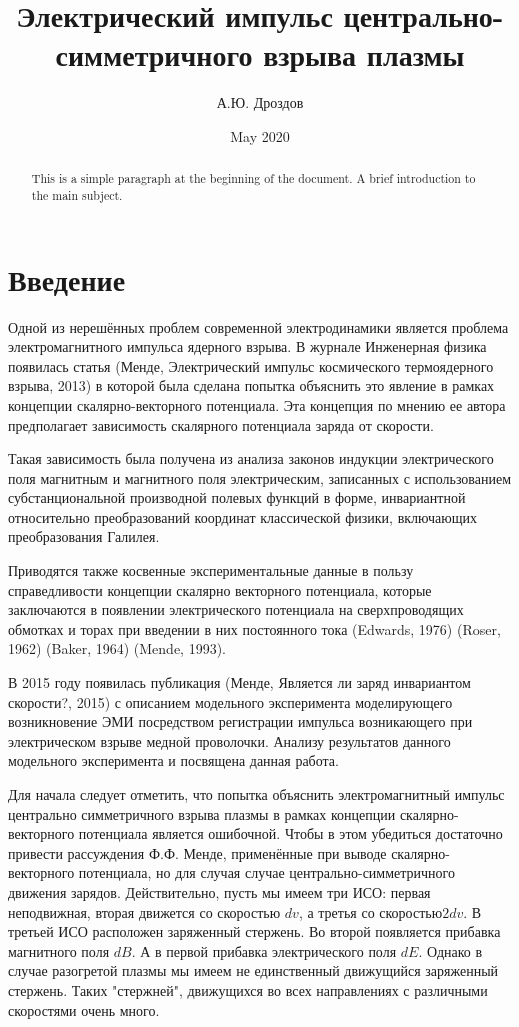 ﻿\documentclass[12pt, letterpaper]{article}
\begin{document}
\title{Электрический импульс центрально-симметричного взрыва плазмы}
\author{А.Ю. Дроздов}
\date{May 2020}

\begin{titlepage}
\maketitle
\end{titlepage}


\begin{abstract}
This is a simple paragraph at the beginning of the document. A brief introduction to the main subject.
\end{abstract}



\section{Введение}

Одной из нерешённых проблем современной электродинамики является проблема электромагнитного импульса ядерного взрыва. В журнале Инженерная физика появилась статья (Менде, Электрический импульс космического термоядерного взрыва, 2013) в которой была сделана попытка объяснить это явление в рамках концепции скалярно-векторного потенциала. Эта концепция по мнению ее автора предполагает зависимость скалярного потенциала заряда от скорости.

Такая зависимость была получена из анализа законов индукции электрического поля магнитным и магнитного поля электрическим, записанных с использованием субстанциональной производной полевых функций в форме, инвариантной относительно преобразований координат классической физики, включающих преобразования Галилея.

Приводятся также косвенные экспериментальные данные в пользу справедливости концепции скалярно векторного потенциала, которые заключаются в появлении электрического потенциала на сверхпроводящих обмотках и торах при введении в них постоянного тока (Edwards, 1976) (Roser, 1962) (Baker, 1964) (Mende, 1993).

В 2015 году появилась публикация (Менде, Является ли заряд инвариантом скорости?, 2015) с описанием модельного эксперимента моделирующего возникновение ЭМИ посредством регистрации импульса возникающего при электрическом взрыве медной проволочки. Анализу результатов данного модельного эксперимента и посвящена данная работа.

Для начала следует отметить, что попытка объяснить электромагнитный импульс центрально симметричного взрыва плазмы в рамках концепции скалярно-векторного потенциала является ошибочной. Чтобы в этом убедиться достаточно привести рассуждения Ф.Ф. Менде, применённые при выводе скалярно-векторного потенциала, но для случая случае центрально-симметричного движения зарядов.
Действительно, пусть мы имеем три ИСО: первая неподвижная, вторая движется со скоростью $dv$, а третья со скоростью$2dv$. В третьей ИСО расположен заряженный стержень. Во второй появляется прибавка магнитного поля $dB$. А в первой прибавка электрического поля $dE$.
Однако в случае разогретой плазмы мы имеем не единственный движущийся заряженный стержень. Таких "стержней", движущихся во всех направлениях с различными скоростями очень много.
\end{document}
